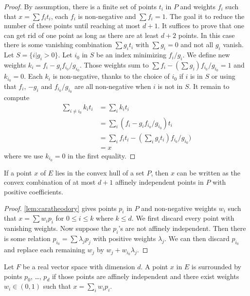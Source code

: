 \begin{proof}
  \leanok
  By assumption, there is a finite set of points $t_i$ in $P$ and
  weights $f_i$ such that $x = \sum f_i t_i$, each $f_i$ is non-negative
  and $\sum f_i = 1$.
  The goal it to reduce the number of these points until reaching at most
  $d+1$.
  It suffices to prove that one can get rid of one point as long as
  there are at least $d+2$ points.
  In this case there is some vanishing combination $\sum g_i t_i$ with
  $\sum g_i = 0$ and not all $g_i$ vanish.
  Let $S = \{i | g_i > 0\}$.
  Let $i_0$ in $S$ be an index minimizing $f_i/g_i$.
  We define new weights $k_i = f_i - g_i f_{i_0}/g_{i_0}$.
  Those weights sum to $\sum f_i - (\sum g_i)f_{i_0}/g_{i_0} = 1$
  and $k_{i_0} = 0$.
  Each $k_i$ is non-negative, thanks to the choice of $i_0$ if
  $i$ is in $S$ or using that $f_i$, $-g_i$ and $f_{i_0}/g_{i_0}$
  are all non-negative when $i$ is not in $S$.
  It remain to compute
  \begin{align*}
    \sum_{i ≠ i_0} k_i t_i &= \sum_i k_i t_i \\
      &= \sum_i (f_i - g_i f_{i_0}/g_{i_0}) t_i  \\
      &= \sum_i f_i t_i - \left(\sum_i g_i t_i\right)f_{i_0}/g_{i_0})   \\
      &= x
  \end{align*}
  where we use $k_{i_0} = 0$ in the first equality.
\end{proof}

\begin{lemma}
\label{lem:refined_caratheodory}
  If a point $x$ of $E$ lies in the convex hull of a set $P$, then $x$
  can be written as the convex combination of at most $d + 1$ affinely
  independent points in $P$ with positive coefficients.
\end{lemma}

\begin{proof}
  \cref{lem:caratheodory} gives points $p_i$ in $P$ and non-negative
  weights $w_i$ such that $x = \sum w_i p_i$ for $0 ≤ i ≤ k$ where
  $k ≤ d$. We first discard every point with vanishing weights.
  Now suppose the $p_i$'s are not affinely independent. Then there is
  some relation $p_{i_0} = \sum λ_j p_j$ with positive weights
  $λ_j$. We can then discard $p_{i_0}$ and replace each remaining
  $w_j$ by $w_j + w_{i_0}λ _j$.
\end{proof}


\begin{definition}
  \label{def:surrounds_points}
  \leanok
  Let $F$ be a real vector space with dimension $d$. A point $x$ in $E$
  is surrounded by points $p_0$, \dots, $p_d$ if those points are
  affinely independent and there exist weights $w_i ∈ (0, 1)$ such
  that $x = \sum_i w_i p_i$.
\end{definition}

